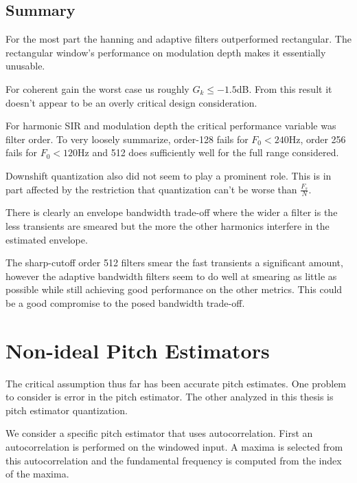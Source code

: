 \documentclass [11pt, proquest,oneside] {ganter_thesis}[2015/03/03]
\begin{document}
\clearpage

\subsection{Summary}

For the most part the hanning and adaptive filters outperformed rectangular.  The rectangular window's performance on modulation depth makes it essentially unusable.

For coherent gain the worst case us roughly $G_k \leq -1.5$dB.  From this result it doesn't appear to be an overly critical design consideration.

For harmonic SIR and modulation depth the critical performance variable was filter order.  To very loosely summarize, order-128 fails for $F_0 < 240$Hz, order 256 fails for $F_0 < 120$Hz and 512 does sufficiently well for the full range considered.

Downshift quantization also did not seem to play a prominent role.  This is in part affected by the restriction that quantization can't be worse than $\frac{F_s}{N}$.

There is clearly an envelope bandwidth trade-off where the wider a filter is the less transients are smeared but the more the other harmonics interfere in the estimated envelope.

The sharp-cutoff order 512 filters smear the fast transients a significant amount, however the adaptive bandwidth filters seem to do well at smearing as little as possible while still achieving good performance on the other metrics.  This could be a good compromise to the posed bandwidth trade-off.


\section{Non-ideal Pitch Estimators}\label{section:non-ideal_pitch}

The critical assumption thus far has been accurate pitch estimates.  One problem to consider is error in the pitch estimator.  The other analyzed in this thesis is pitch estimator quantization.

We consider a specific pitch estimator that uses autocorrelation.  First an autocorrelation is performed on the windowed input.  A maxima is selected from this autocorrelation and the fundamental frequency is computed from the index of the maxima.
\end{document}
